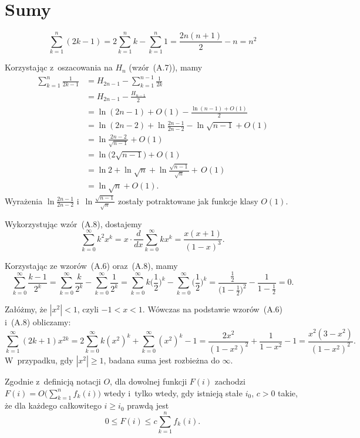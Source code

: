 \chapter{Sumy}


\exercise %
\[
	\sum_{k=1}^n(2k-1) = 2\sum_{k=1}^nk-\sum_{k=1}^n1 = \frac{2n(n+1)}{2}-n = n^2
\]

\exercise %
Korzystając z~oszacowania na $H_n$ (wzór~(A.7)), mamy
\begin{align*}
	\sum_{k=1}^n\frac{1}{2k-1} &= H_{2n-1}-\sum_{k=1}^{n-1}\frac{1}{2k} \\
	&= H_{2n-1}-\frac{H_{n-1}}{2} \\
	&= \ln(2n-1)+O(1)-\frac{\ln(n-1)+O(1)}{2} \\
	&= \ln(2n-2)+\ln\frac{2n-1}{2n-2}-\ln\sqrt{n-1}+O(1) \\
	&= \ln\frac{2n-2}{\sqrt{n-1}}+O(1) \\[1mm]
	&= \ln\bigl(2\sqrt{n-1}\bigr)+O(1) \\
	&= \ln2+\ln\sqrt{n}+\ln\frac{\sqrt{n-1}}{\sqrt{n}}+\,O(1) \\
	&= \ln\sqrt{n}+O(1).
\end{align*}
Wyrażenia $\ln\frac{2n-1}{2n-2}$ i~$\ln\frac{\sqrt{n-1}}{\sqrt{n}}$ zostały potraktowane jak funkcje klasy $O(1)$.

\exercise %
Wykorzystując wzór~(A.8), dostajemy
\[
	\sum_{k=0}^\infty k^2x^k = x\cdot\frac{d}{dx}\sum_{k=0}^\infty kx^k = \frac{x(x+1)}{(1-x)^3}.
\]

\exercise %
Korzystając ze wzorów~(A.6) oraz~(A.8), mamy
\[
	\sum_{k=0}^\infty\frac{k-1}{2^k} = \sum_{k=0}^\infty\frac{k}{2^k}-\sum_{k=0}^\infty\frac{1}{2^k} = \sum_{k=0}^\infty k\biggl(\frac{1}{2}\biggr)^k-\sum_{k=0}^\infty\biggl(\frac{1}{2}\biggr)^k = \frac{\frac{1}{2}}{\bigl(1-\frac{1}{2}\bigr)^2}-\frac{1}{1-\frac{1}{2}} = 0.
\]

\exercise %
Załóżmy, że $|x^2|<1$, czyli $-1<x<1$.
Wówczas na podstawie wzorów~(A.6) i~(A.8) obliczamy:
\[
	\sum_{k=1}^\infty(2k+1)x^{2k} = 2\sum_{k=0}^\infty k(x^2)^k+\sum_{k=0}^\infty(x^2)^k-1 = \frac{2x^2}{(1-x^2)^2}+\frac{1}{1-x^2}-1 = \frac{x^2(3-x^2)}{(1-x^2)^2}.
\]
W~przypadku, gdy $|x^2|\ge1$, badana suma jest rozbieżna do $\infty$.

\exercise %

\noindent Zgodnie z~definicją notacji $O$, dla dowolnej funkcji $F(i)$ zachodzi $F(i)=O\bigl(\sum_{k=1}^nf_k(i)\bigr)$ wtedy i~tylko wtedy, gdy istnieją stałe $i_0$, $c>0$ takie, że dla każdego całkowitego $i\ge i_0$ prawdą jest
\[
	0 \le F(i) \le c\sum_{k=1}^nf_k(i).
\]

